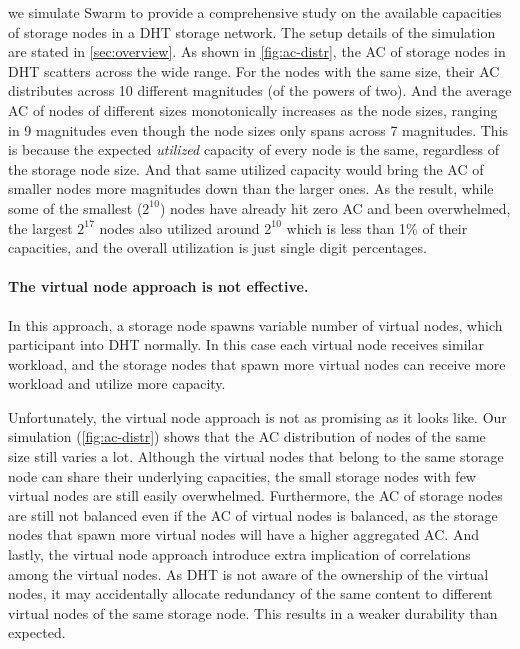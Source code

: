 we simulate Swarm to provide a comprehensive study on the available capacities of storage nodes in a DHT storage network.
The setup details of the simulation are stated in \autoref{sec:overview}.
As shown in \autoref{fig:ac-distr}, the AC of storage nodes in DHT scatters across the wide range.
For the nodes with the same size, their AC distributes across 10 different magnitudes (of the powers of two).
And the average AC of nodes of different sizes monotonically increases as the node sizes, ranging in 9 magnitudes even though the node sizes only spans across 7 magnitudes.
This is because the expected \emph{utilized} capacity of every node is the same, regardless of the storage node size.
And that same utilized capacity would bring the AC of smaller nodes more magnitudes down than the larger ones.
As the result, while some of the smallest ($2^{10}$) nodes have already hit zero AC and been overwhelmed, the largest $2^{17}$ nodes also utilized around $2^{10}$ which is less than 1\% of their capacities, and the overall utilization is just single digit percentages.

\paragraph{The virtual node approach is not effective.}
In this approach, a storage node spawns variable number of virtual nodes, which participant into DHT normally.
In this case each virtual node receives similar workload, and the storage nodes that spawn more virtual nodes can receive more workload and utilize more capacity.

Unfortunately, the virtual node approach is not as promising as it looks like.
Our simulation (\autoref{fig:ac-distr}) shows that the AC distribution of nodes of the same size still varies a lot.
Although the virtual nodes that belong to the same storage node can share their underlying capacities, the small storage nodes with few virtual nodes are still easily overwhelmed.
Furthermore, the AC of storage nodes are still not balanced even if the AC of virtual nodes is balanced, as the storage nodes that spawn more virtual nodes will have a higher aggregated AC.
And lastly, the virtual node approach introduce extra implication of correlations among the virtual nodes.
As DHT is not aware of the ownership of the virtual nodes, it may accidentally allocate redundancy of the same content to different virtual nodes of the same storage node.
This results in a weaker durability than expected.

\fi